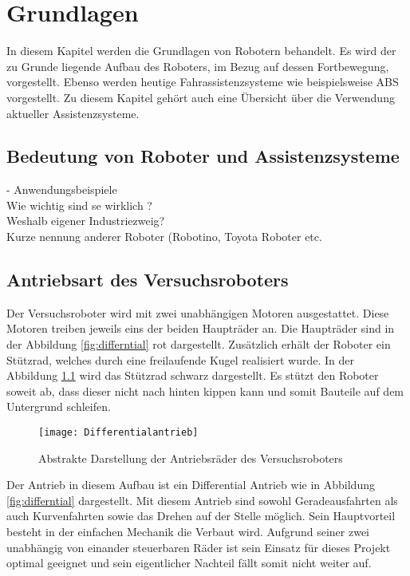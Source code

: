 \chapter{Grundlagen}
In diesem Kapitel werden die Grundlagen von Robotern behandelt. Es wird der zu Grunde liegende Aufbau des Roboters, im Bezug auf dessen Fortbewegung, vorgestellt. Ebenso werden heutige Fahrassistenzsysteme wie beispielsweise ABS vorgestellt. Zu diesem Kapitel gehört auch eine Übersicht über die Verwendung aktueller Assistenzsysteme.
\section{Bedeutung von Roboter und Assistenzsysteme}
- Anwendungsbeispiele\\
Wie wichtig sind se wirklich ?\\
Weshalb eigener Industriezweig?\\
Kurze nennung anderer Roboter (Robotino, Toyota Roboter etc.\\

\section{Antriebsart des Versuchsroboters} \label{lab:Antriebsart}
Der Versuchsroboter wird mit zwei unabhängigen Motoren ausgestattet. Diese Motoren treiben jeweils eins der beiden Haupträder an. Die Haupträder sind in der Abbildung \vref{fig:differntial} rot dargestellt. Zusätzlich erhält der Roboter ein Stützrad, welches durch eine freilaufende Kugel realisiert wurde. In der Abbildung \ref{fig:differntial} wird das Stützrad schwarz dargestellt. Es stützt den Roboter soweit ab, dass dieser nicht nach hinten kippen kann und somit Bauteile auf dem Untergrund schleifen.
\begin{figure}[htb]
\centering
\texttt{[image: Differentialantrieb]}
\caption{Abstrakte Darstellung der Antriebsräder des Versuchsroboters}
\label{fig:differntial}
\end{figure}

Der Antrieb in diesem Aufbau ist ein Differential Antrieb wie in Abbildung \vref{fig:differntial} dargestellt. Mit diesem Antrieb sind sowohl Geradeausfahrten als auch Kurvenfahrten sowie das Drehen auf der Stelle möglich. Sein Hauptvorteil besteht in der einfachen Mechanik die Verbaut wird. Aufgrund seiner zwei unabhängig von einander steuerbaren Räder ist sein Einsatz für dieses Projekt optimal geeignet und sein eigentlicher Nachteil fällt somit nicht weiter auf.
 
